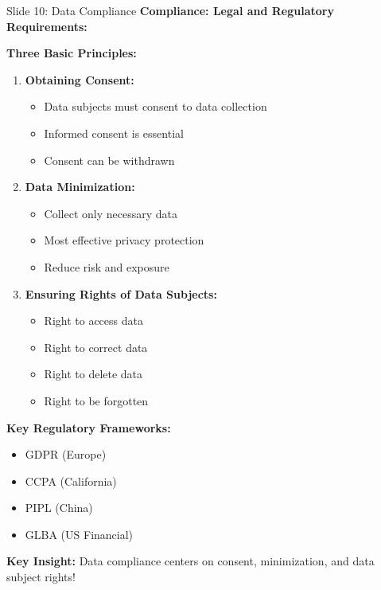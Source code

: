 \documentclass[8pt]{beamer}
\begin{document}
	\begin{frame}{Slide 10: Data Compliance}
		\fontsize{6.5}{7.5}\selectfont
		\textbf{Compliance: Legal and Regulatory Requirements:}
		
		\vspace{0.1cm}
		\textbf{Three Basic Principles:}
		\begin{enumerate}
			\item \textbf{Obtaining Consent:}
			\begin{itemize}
				\item Data subjects must consent to data collection
				\item Informed consent is essential
				\item Consent can be withdrawn
			\end{itemize}
			\item \textbf{Data Minimization:}
			\begin{itemize}
				\item Collect only necessary data
				\item Most effective privacy protection
				\item Reduce risk and exposure
			\end{itemize}
			\item \textbf{Ensuring Rights of Data Subjects:}
			\begin{itemize}
				\item Right to access data
				\item Right to correct data
				\item Right to delete data
				\item Right to be forgotten
			\end{itemize}
		\end{enumerate}
		
		\vspace{0.1cm}
		\textbf{Key Regulatory Frameworks:}
		\begin{itemize}
			\item GDPR (Europe)
			\item CCPA (California)
			\item PIPL (China)
			\item GLBA (US Financial)
		\end{itemize}
		
		\textcolor{myblue}{\textbf{Key Insight:}} Data compliance centers on \textcolor{myblue}{consent, minimization, and data subject rights}!
	\end{frame}
	
\end{document}
